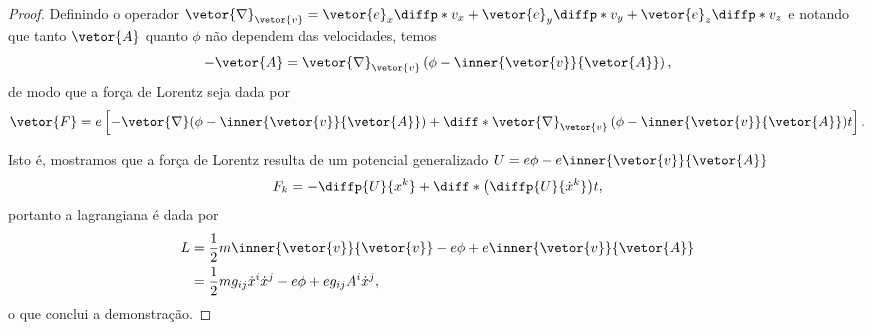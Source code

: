 \begin{proof}
    Definindo o operador \(\vetor{\nabla}_{\vetor{v}} = \vetor{e}_x\diffp*{}{v_x} + \vetor{e}_y\diffp*{}{v_y} + \vetor{e}_z\diffp*{}{v_z}\) e notando que tanto \(\vetor{A}\) quanto \(\phi\) não dependem das velocidades, temos
    \begin{equation*}
        -\vetor{A} = \vetor{\nabla}_{\vetor{v}}\left(\phi - \inner{\vetor{v}}{\vetor{A}}\right),
    \end{equation*}
    de modo que a força de Lorentz seja dada por
    \begin{equation*}
        \vetor{F} = e \left[- \vetor{\nabla}(\phi - \inner{\vetor{v}}{\vetor{A}}) + \diff*{\vetor{\nabla}_{\vetor{v}}\left(\phi - \inner{\vetor{v}}{\vetor{A}}\right)}{t}\right].
    \end{equation*}

    Isto é, mostramos que a força de Lorentz resulta de um potencial generalizado \(U = e\phi - e\inner{\vetor{v}}{\vetor{A}}\)
    \begin{equation*}
        F_k = - \diffp{U}{x^k} + \diff*{\left(\diffp{U}{\dot{x}^k}\right)}{t},
    \end{equation*}
    portanto a lagrangiana é dada por
    \begin{align*}
        L &= \frac12 m\inner{\vetor{v}}{\vetor{v}} - e\phi + e\inner{\vetor{v}}{\vetor{A}}\\
          &= \frac12 mg_{ij} \dot{x}^i \dot{x}^j - e\phi + eg_{ij}A^i\dot{x}^j,
    \end{align*}
    o que conclui a demonstração.
\end{proof}

